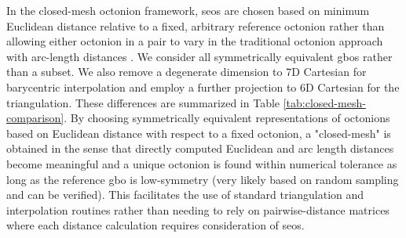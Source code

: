 \documentclass[preprint,12pt]{elsarticle}
\begin{document}
In the closed-mesh octonion framework, \glspl{seo} are chosen based on minimum Euclidean distance relative to a fixed, arbitrary reference octonion rather than allowing either octonion in a pair to vary in the traditional octonion approach with arc-length distances \cite{francisGeodesicOctonionMetric2019}. We consider all symmetrically equivalent \glspl{gbo} rather than a subset. We also remove a degenerate dimension to 7D Cartesian for barycentric interpolation and employ a further projection to 6D Cartesian for the triangulation. These differences are summarized in Table \ref{tab:closed-mesh-comparison}. By choosing symmetrically equivalent representations of octonions based on Euclidean distance with respect to a fixed octonion, a "closed-mesh" is obtained in the sense that directly computed Euclidean and arc length distances become meaningful and a unique octonion is found within numerical tolerance as long as the reference \gls{gbo} is low-symmetry (very likely based on random sampling and can be verified). This facilitates the use of standard triangulation and interpolation routines rather than needing to rely on pairwise-distance matrices where each distance calculation requires consideration of \glspl{seo}.

  
\end{document}
